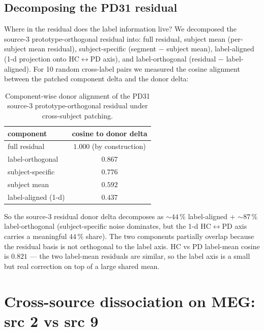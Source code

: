 \documentclass[11pt]{article}
\begin{document}
\subsection{Decomposing the PD31 residual}

Where in the residual does the label information live? We decomposed the
source-3 prototype-orthogonal residual into: full residual, subject mean
(per-subject mean residual), subject-specific (segment $-$ subject mean),
label-aligned (1-d projection onto HC$\leftrightarrow$PD axis), and
label-orthogonal (residual $-$ label-aligned). For 10 random cross-label
pairs we measured the cosine alignment between the patched component delta
and the donor delta:

\begin{table}[h]
\centering
\small
\begin{tabular}{lc}
\toprule
\textbf{component} & \textbf{cosine to donor delta} \\
\midrule
full residual           & $1.000$ (by construction) \\
label-orthogonal        & $\mathbf{0.867}$ \\
subject-specific        & $0.776$ \\
subject mean            & $0.592$ \\
label-aligned (1-d)     & $\mathbf{0.437}$ \\
\bottomrule
\end{tabular}
\caption{Component-wise donor alignment of the PD31 source-3
prototype-orthogonal residual under cross-subject patching.
\label{tab:residual-decomp}}
\end{table}

So the source-3 residual donor delta decomposes as $\sim 44\,\%$ label-aligned
+ $\sim 87\,\%$ label-orthogonal (subject-specific noise dominates, but the
1-d HC$\leftrightarrow$PD axis carries a meaningful $44\,\%$ share). The two
components partially overlap because the residual basis is not orthogonal to
the label axis. HC vs PD label-mean cosine is $0.821$ --- the two label-mean
residuals are similar, so the label axis is a small but real correction on top
of a large shared mean.

\section{Cross-source dissociation on MEG: src 2 vs src 9}\label{sec:dissociation}
\end{document}
